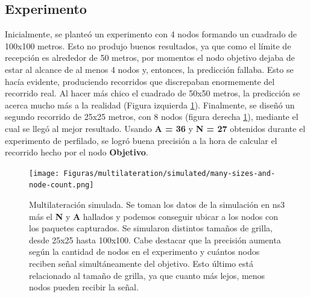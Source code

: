 \subsection{Experimento}
Inicialmente, se planteó un experimento con 4 nodos formando un cuadrado de 100x100 metros. Esto no produjo buenos resultados, ya que como el límite de recepción es alrededor de 50 metros, por momentos el nodo objetivo dejaba de estar al alcance de al menos 4 nodos y, entonces, la predicción fallaba. Esto se hacía evidente, produciendo recorridos que discrepaban enormemente del recorrido real. Al hacer más chico el cuadrado de 50x50 metros, la predicción se acerca mucho más a la realidad (Figura izquierda \ref{fig:ns3-multi-combined}). Finalmente, se diseñó un segundo recorrido de 25x25 metros, con 8 nodos (figura derecha \ref{fig:ns3-multi-combined}), mediante el cual se llegó al mejor resultado.
Usando \textbf{A = 36} y \textbf{N = 27} obtenidos durante el experimento de perfilado, se logró buena precisión a la hora de calcular el recorrido hecho por el nodo \textbf{Objetivo}.
\begin{figure}[!htb]
\centering
\texttt{[image: Figuras/multilateration/simulated/many-sizes-and-node-count.png]}
\captionsetup{margin=2cm}
\caption[Multilateración simulada]{Multilateración simulada. Se toman los datos de la simulación en \acs{ns3} más el \textbf{N} y \textbf{A} hallados y podemos conseguir ubicar a los nodos con los paquetes capturados. Se simularon distintos tamaños de grilla, desde 25x25 hasta 100x100. Cabe destacar que la precisión aumenta según la cantidad de nodos en el experimento y cuántos nodos reciben señal simultáneamente del objetivo. Esto último está relacionado al tamaño de grilla, ya que cuanto más lejos, menos nodos pueden recibir la señal.}
\label{fig:ns3-multi-combined}
\end{figure}
